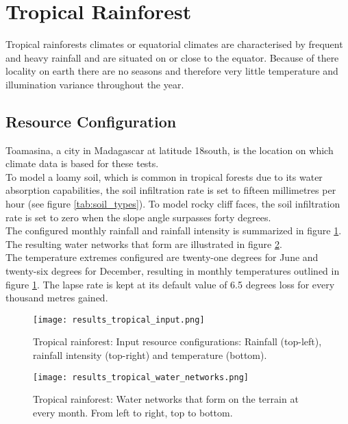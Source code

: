 \section{Tropical Rainforest}

Tropical rainforests climates or equatorial climates are characterised by frequent and heavy rainfall and are situated on or close to the equator. Because of there locality on earth there are no seasons and therefore very little temperature and illumination variance throughout the year.\\

\subsection{Resource Configuration}

Toamasina, a city in Madagascar at latitude 18\textdegree south, is the location on which climate data is based for these tests.\\

To model a loamy soil, which is common in tropical forests due to its water absorption capabilities, the soil infiltration rate is set to fifteen millimetres per hour (see figure \ref{tab:soil_types}). To model rocky cliff faces, the soil infiltration rate is set to zero when the slope angle surpasses forty degrees.\\

The configured monthly rainfall and rainfall intensity is summarized in figure \ref{fig:results_tropical_input}. The resulting water networks that form are illustrated in figure \ref{fig:results_tropical_water_networks}.\\

The temperature extremes configured are twenty-one degrees for June and twenty-six degrees for December, resulting in monthly temperatures outlined in figure \ref{fig:results_tropical_input}. The lapse rate is kept at its default value of 6.5 degrees loss for every thousand metres gained. \\

\begin{figure}
\center
	\texttt{[image: results\_tropical\_input.png]}
	\caption{ Tropical rainforest: Input resource configurations: Rainfall (top-left), rainfall intensity (top-right) and temperature (bottom).}
	\label{fig:results_tropical_input}
\end{figure}

\begin{figure}
\center
	\texttt{[image: results\_tropical\_water\_networks.png]}
	\caption{ Tropical rainforest: Water networks that form on the terrain at every month. From left to right, top to bottom.}
	\label{fig:results_tropical_water_networks}
\end{figure}

